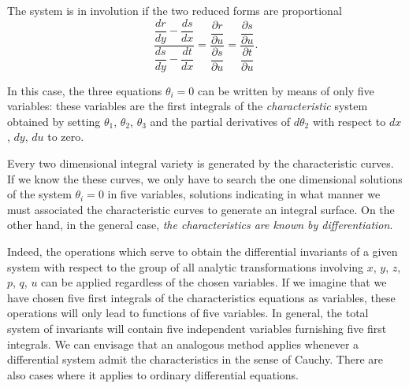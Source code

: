 \documentclass[leqno,11pt]{article}
\newcommand{\pd}{\partial}
\theoremstyle{shape1}
\theoremstyle{shape0}
\theoremstyle{shape2}
\theoremstyle{definition}
\begin{document}
The system is in involution if the two reduced forms are proportional
\[
\frac{\dfrac{dr}{dy}-\dfrac{ds}{dx}}{\dfrac{ds}{dy}-\dfrac{dt}{dx}}=\frac{\dfrac{\pd r}{\pd u}}{\dfrac{\pd s}{\pd u}}=\frac{\dfrac{\pd s}{\pd u}}{\dfrac{\pd t}{\pd u}}.
\]

In this case, the three equations $\theta_{i}=0$ can be written by means of only five variables: these variables are the first integrals of the \emph{characteristic} system obtained by setting $\theta_{1}$, $\theta_{2}$, $\theta_{3}$ and the partial derivatives of $d\theta_{2}$ with respect to $dx$, $dy$, $du$ to zero.

Every two dimensional integral variety is generated by the characteristic curves. If we know the these curves, we only have to search the one dimensional solutions of the system $\theta_{i}=0$ in five variables, solutions indicating in what manner we must associated the characteristic curves to generate an integral surface. On the other hand, in the general case, \emph{the characteristics are known by differentiation}.

Indeed, the operations which serve to obtain the differential invariants of a given system with respect to the group of all analytic transformations involving $x$, $y$, $z$, $p$, $q$, $u$ can be applied regardless of the chosen variables. If we imagine that we have chosen five first integrals of the characteristics equations as variables, these operations will only lead to functions of five variables. In general, the total system of invariants will contain five independent variables furnishing five first integrals. We can envisage that an analogous method applies whenever a differential system admit the characteristics in the sense of Cauchy. There are also cases where it applies to ordinary differential equations.
\end{document}
